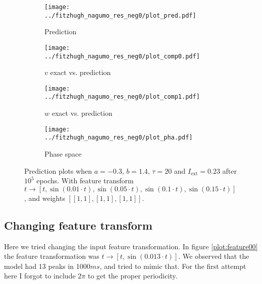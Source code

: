 \documentclass[a4paper]{article}
\begin{document}
\begin{figure}[H]
	\centering 
	\begin{subfigure}[b]{0.47\textwidth}
		\centering
		\texttt{[image: ../fitzhugh\_nagumo\_res\_neg0/plot\_pred.pdf]}
		\caption{Prediction}
		\label{fig:neg2a}
	\end{subfigure}
	\begin{subfigure}[b]{0.47\textwidth}
		\centering
		\texttt{[image: ../fitzhugh\_nagumo\_res\_neg0/plot\_comp0.pdf]}
		\caption{$v$ exact vs. prediction}
		\label{fig:neg2b}
	\end{subfigure}
	\begin{subfigure}[b]{0.47\textwidth}
		\centering
		\texttt{[image: ../fitzhugh\_nagumo\_res\_neg0/plot\_comp1.pdf]}
		\caption{$w$ exact vs. prediction}
		\label{fig:neg2c}
	\end{subfigure}
	\begin{subfigure}[b]{0.47\textwidth}
		\centering
		\texttt{[image: ../fitzhugh\_nagumo\_res\_neg0/plot\_pha.pdf]}
		\caption{Phase space}
		\label{fig:neg2d}
	\end{subfigure}
	\caption{Prediction plots when $a=-0.3$, $b=1.4$, $\tau=20$ and $ I_{\text{ext}}=0.23$ after $10^5$ epochs. With feature transform $t \rightarrow \left[ t, \sin(0.01 \cdot  t), \sin(0.05 \cdot  t), \sin(0.1 \cdot  t), \sin(0.15 \cdot  t)\right] $, and weights $\left[ \left[ 1, 1\right], \left[ 1, 1\right], \left[ 1, 1\right]\right]$.}
	\label{plot:neg2}
\end{figure}



\subsection{Changing feature transform}

Here we tried changing the input feature transformation. In figure \ref{plot:feature00} the feature transformation was $t \rightarrow \left[ t, \sin(0.013\cdot t) \right] $. We observed that the model had 13 peaks in 1000$ms$, and tried to mimic that. For the first attempt here I forgot to include $2\pi$ to get the proper periodicity. 
\end{document}
